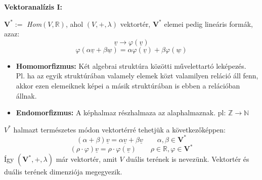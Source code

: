 \documentclass[11pt,a4paper]{article}
\begin{document}
\newpage
\textbf{Vektoranalízis I:}

    \begin{tcolorbox}[colback=red!5!white,colframe=red!60!black,title= 1. Duális tér]
    $\mathbf{V}^* :=$ \textit{Hom}$(V,\mathbb{R})$, ahol $(V,+, \lambda)$ vektortér, $\mathbf{V}^*$ elemei pedig lineáris formák, azaz:
    $$\underline{v} \rightarrow \varphi(\underline{v})$$
    $$\varphi(\alpha\underline{v} + \beta\underline{w}) = \alpha\varphi(\underline{v}) + \beta\varphi(\underline{w})$$
    \begin{itemize}
        \item \textbf{Homomorfizmus:} Két algebrai struktúra közötti művelettartó leképezés. \\
        Pl. ha az egyik struktúrában valamely elemek közt valamilyen reláció áll fenn, akkor ezen elemeiknek képei a másik struktúrában is ebben a relációban állnak.
        \item \textbf{Endomorfizmus:} A képhalmaz részhalmaza az alaphalmaznak. pl: $\mathbb{Z} \rightarrow \mathbb{N}$
    \end{itemize}
    $V^*$ halmazt természetes módon vektortérré tehetjük a következőképpen:
    $$(\alpha + \beta )\underline{v} = \alpha\underline{v} + \beta\underline{v} \quad\quad \alpha,\beta \in \mathbf{V}^*$$
    $$(\rho \cdot \varphi)\underline{v} = \rho \cdot \varphi(\underline{v}) \quad\quad \rho \in \mathbb{R}, \varphi \in \mathbf{V}^*$$
    Így $(\mathbf{V}^*, +, \lambda)$ már vektortér, amit $V$ duális terének is nevezünk. Vektortér és duális terének dimenziója megegyezik. 
    \end{tcolorbox}
\end{document}
